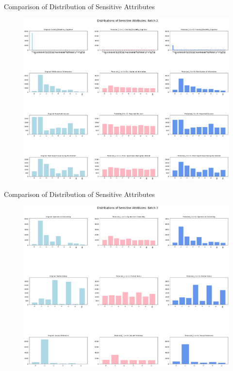\documentclass{beamer}
\begin{document}
\begin{frame}{Comparison of Distribution of Sensitive Attributes }
\begin{figure}
    \centering
    \includegraphics[width=1\textwidth]{final_2_2.png}
\end{figure}
\end{frame}

\begin{frame}{Comparison of Distribution of Sensitive Attributes }
\begin{figure}
    \centering
    \includegraphics[width=1\textwidth]{final_2_3.png}
\end{figure}
\end{frame}
\end{document}
